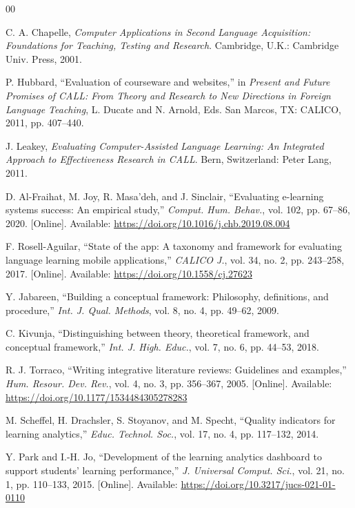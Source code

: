 \documentclass[11pt,a4paper]{article}
\begin{document}
\begin{thebibliography}{00}

C. A. Chapelle, \textit{Computer Applications in Second Language Acquisition: Foundations for Teaching, Testing and Research}. Cambridge, U.K.: Cambridge Univ. Press, 2001.

P. Hubbard, ``Evaluation of courseware and websites,'' in \textit{Present and Future Promises of CALL: From Theory and Research to New Directions in Foreign Language Teaching}, L. Ducate and N. Arnold, Eds. San Marcos, TX: CALICO, 2011, pp. 407--440.

J. Leakey, \textit{Evaluating Computer-Assisted Language Learning: An Integrated Approach to Effectiveness Research in CALL}. Bern, Switzerland: Peter Lang, 2011.

D. Al-Fraihat, M. Joy, R. Masa'deh, and J. Sinclair, ``Evaluating e-learning systems success: An empirical study,'' \textit{Comput. Hum. Behav.}, vol. 102, pp. 67--86, 2020. [Online]. Available: \url{https://doi.org/10.1016/j.chb.2019.08.004}

F. Rosell-Aguilar, ``State of the app: A taxonomy and framework for evaluating language learning mobile applications,'' \textit{CALICO J.}, vol. 34, no. 2, pp. 243--258, 2017. [Online]. Available: \url{https://doi.org/10.1558/cj.27623}

Y. Jabareen, ``Building a conceptual framework: Philosophy, definitions, and procedure,'' \textit{Int. J. Qual. Methods}, vol. 8, no. 4, pp. 49--62, 2009.

C. Kivunja, ``Distinguishing between theory, theoretical framework, and conceptual framework,'' \textit{Int. J. High. Educ.}, vol. 7, no. 6, pp. 44--53, 2018.

R. J. Torraco, ``Writing integrative literature reviews: Guidelines and examples,'' \textit{Hum. Resour. Dev. Rev.}, vol. 4, no. 3, pp. 356--367, 2005. [Online]. Available: \url{https://doi.org/10.1177/1534484305278283}

M. Scheffel, H. Drachsler, S. Stoyanov, and M. Specht, ``Quality indicators for learning analytics,'' \textit{Educ. Technol. Soc.}, vol. 17, no. 4, pp. 117--132, 2014.

Y. Park and I.-H. Jo, ``Development of the learning analytics dashboard to support students' learning performance,'' \textit{J. Universal Comput. Sci.}, vol. 21, no. 1, pp. 110--133, 2015. [Online]. Available: \url{https://doi.org/10.3217/jucs-021-01-0110}


\end{thebibliography}
\end{document}
